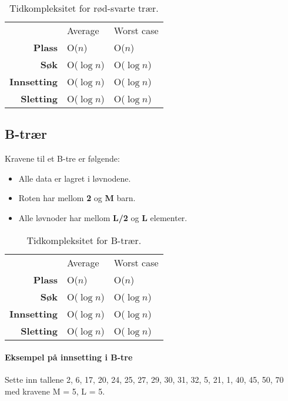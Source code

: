 \documentclass[11pt,a4paper]{article}
\theoremstyle{def}
\begin{document}
\begin{table}[h!]
\centering
\begin{tabular}{rll}
&Average&Worst case\\
\textbf{Plass} & O($n$) & O($n$)\\
\textbf{Søk} & O($\log n$) & O($\log n$)\\
\textbf{Innsetting} & O($\log n$) & O($\log n$)\\
\textbf{Sletting} & O($\log n$) & O($\log n$)\\
\end{tabular}
\label{tab:obst}
\caption{Tidkompleksitet for rød-svarte trær.}
\end{table}

\newpage

\subsection{B-trær}

Kravene til et B-tre er følgende:
\begin{itemize}
\item
Alle data er lagret i løvnodene.
\item
Roten har mellom \textbf{2} og \textbf{M} barn. 
\item
Alle løvnoder har mellom \textbf{L/2} og \textbf{L} elementer.
\end{itemize}

\begin{table}[h!]
\centering
\begin{tabular}{rll}
&Average&Worst case\\
\textbf{Plass} & O($n$) & O($n$)\\
\textbf{Søk} & O($\log n$) & O($\log n$)\\
\textbf{Innsetting} & O($\log n$) & O($\log n$)\\
\textbf{Sletting} & O($\log n$) & O($\log n$)\\
\end{tabular}
\label{tab:obst}
\caption{Tidkompleksitet for B-trær.}
\end{table}

\newpage

\paragraph{Eksempel på innsetting i B-tre} Sette inn tallene 2, 6, 17, 20, 24, 25, 27, 29, 30, 31, 32, 5, 21, 1, 40, 45, 50, 70 med kravene M = 5, L = 5.
\end{document}
